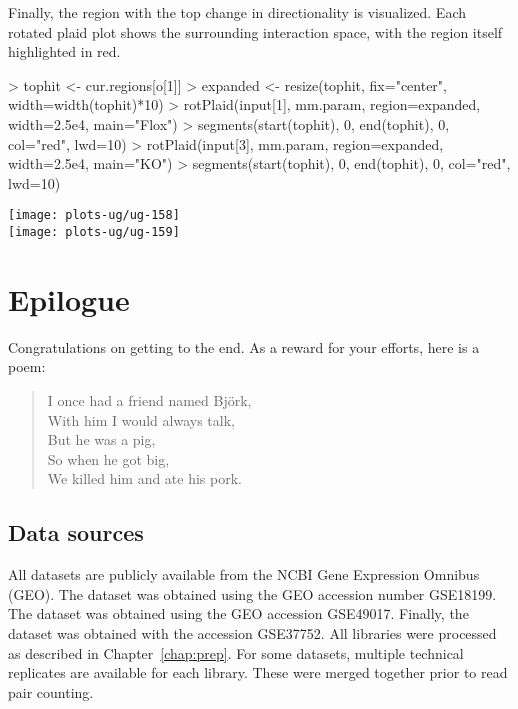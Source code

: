 \documentclass[12pt]{report}
\renewenvironment{Schunk}{\vspace{0pt}}{\vspace{0pt}}
\newenvironment{combox}
{ \begin{shaded}\begin{center}\begin{minipage}[t]{0.95\textwidth} }
{ \end{minipage}\end{center}\end{shaded} }
\begin{document}
Finally, the region with the top change in directionality is visualized.
Each rotated plaid plot shows the surrounding interaction space, with the region itself highlighted in red.





\begin{Schunk}
\begin{Sinput}
> tophit <- cur.regions[o[1]]
> expanded <- resize(tophit, fix="center", width=width(tophit)*10)
> rotPlaid(input[1], mm.param, region=expanded, width=2.5e4, main="Flox")
> segments(start(tophit), 0, end(tophit), 0, col="red", lwd=10)
> rotPlaid(input[3], mm.param, region=expanded, width=2.5e4, main="KO")
> segments(start(tophit), 0, end(tophit), 0, col="red", lwd=10)
\end{Sinput}
\end{Schunk}

\begin{center}
\texttt{[image: plots-ug/ug-158]}
\\
\texttt{[image: plots-ug/ug-159]}
\end{center}


\chapter{Epilogue}

\begin{combox}
Congratulations on getting to the end.
As a reward for your efforts, here is a poem:
\begin{quote}
I once had a friend named Bj\"ork, \\
With him I would always talk, \\
But he was a pig, \\
So when he got big, \\
We killed him and ate his pork.
\end{quote}
\end{combox}

\section{Data sources}
All datasets are publicly available from the NCBI Gene Expression Omnibus (GEO).
The \citeauthor{lieberman2009comprehensive} dataset was obtained using the GEO accession number GSE18199.
The \citeauthor{sofueva2013cohesin} dataset was obtained using the GEO accession GSE49017.
Finally, the \citeauthor{rickman2012oncogene} dataset was obtained with the accession GSE37752.
All libraries were processed as described in Chapter~\ref{chap:prep}.
For some datasets, multiple technical replicates are available for each library.
These were merged together prior to read pair counting.
\end{document}
